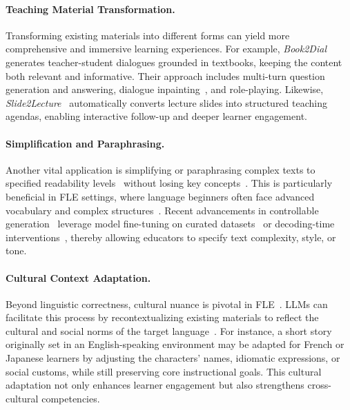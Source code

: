 \paragraph{Teaching Material Transformation.} Transforming existing materials into different forms can yield more comprehensive and immersive learning experiences. For example, \textit{Book2Dial}\cite{wang-etal-2024-book2dial} generates teacher-student dialogues grounded in textbooks, keeping the content both relevant and informative. Their approach includes multi-turn question generation and answering\cite{kim-etal-2022-generating}, dialogue inpainting~\cite{dai2022dialog}, and role-playing. Likewise, \textit{Slide2Lecture}~\cite{zhang2024awaking} automatically converts lecture slides into structured teaching agendas, enabling interactive follow-up and deeper learner engagement.

\paragraph{Simplification and Paraphrasing.} Another vital application is simplifying or paraphrasing complex texts to specified readability levels~\cite{huang2024generating} without losing key concepts~\cite{al2021automated}. This is particularly beneficial in FLE settings, where language beginners often face advanced vocabulary and complex structures~\cite{day2025evaluating}. Recent advancements in controllable generation~\cite{zhang2023survey} leverage model fine-tuning on curated datasets~\cite{zeng-etal-2023-seen} or decoding-time interventions~\cite{liang2024controllable}, thereby allowing educators to specify text complexity, style, or tone.

\paragraph{Cultural Context Adaptation.} Beyond linguistic correctness, cultural nuance is pivotal in FLE~\cite{byram1989cultural,byram2008foreign}. LLMs can facilitate this process by recontextualizing existing materials to reflect the cultural and social norms of the target language~\cite{liu2024culturally}. For instance, a short story originally set in an English-speaking environment may be adapted for French or Japanese learners by adjusting the characters’ names, idiomatic expressions, or social customs, while still preserving core instructional goals. This cultural adaptation not only enhances learner engagement but also strengthens cross-cultural competencies.

